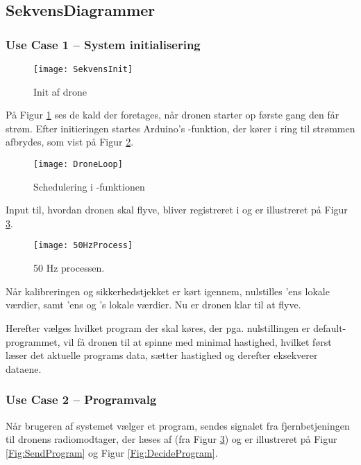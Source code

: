 \documentclass[Main]{subfiles}
\begin{document}
\subsection{SekvensDiagrammer}

\subsubsection{Use Case 1 -- System initialisering}

\begin{figure}[H]
\centering
\texttt{[image: SekvensInit]}
\caption{Init af drone}
\label{Fig:SekvInit}
\end{figure}

På Figur \ref{Fig:SekvInit} ses de kald der foretages, når dronen starter op første gang den får strøm.
Efter initieringen startes Arduino's -funktion, der kører i ring til strømmen afbrydes, som vist på Figur \ref{Fig:SekvDroneHz}.


\begin{figure}[htbp]
\centering
\texttt{[image: DroneLoop]}
\caption{Schedulering i -funktionen}
\label{Fig:SekvDroneHz}
\end{figure}

Input til, hvordan dronen skal flyve, bliver registreret i  og er illustreret på Figur \ref{Fig:50Hz}.

\begin{figure}[H]
\centering
\texttt{[image: 50HzProcess]}
\caption{50 Hz processen. }
\label{Fig:50Hz}
\end{figure}

Når kalibreringen og sikkerhedstjekket er kørt igennem, nulstilles 'ens lokale værdier, samt 'ens og 's lokale værdier.
Nu er dronen klar til at flyve.

Herefter vælges hvilket program der skal køres, der pga. nulstillingen er default-programmet, vil få dronen til at spinne med minimal hastighed, hvilket først læser det aktuelle programs data, sætter hastighed og derefter eksekverer dataene.


\newpage
\subsubsection{Use Case 2 -- Programvalg}
Når brugeren af systemet vælger et program, sendes signalet fra fjernbetjeningen til dronens radiomodtager, der læses af  (fra Figur \ref{Fig:50Hz}) og er illustreret på Figur \ref{Fig:SendProgram} og Figur \ref{Fig:DecideProgram}.
\end{document}
